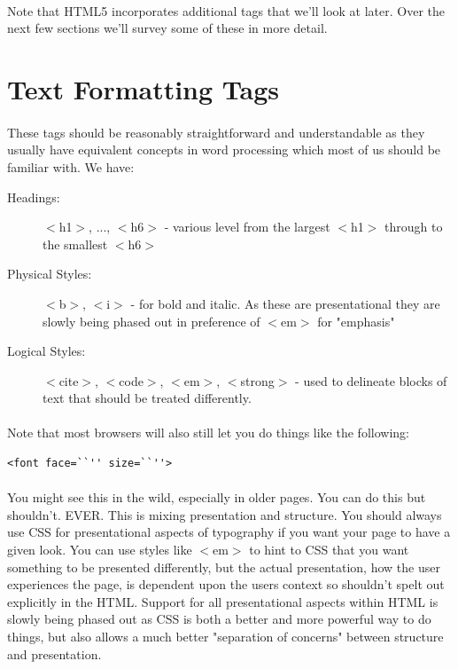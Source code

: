 \paragraph{} Note that HTML5 incorporates additional tags that we'll look at later. Over the next few sections we'll survey some of these in more detail.

\section{Text Formatting Tags}
\paragraph{} These tags should be reasonably straightforward and understandable as they usually have equivalent concepts in word processing which most of us should be familiar with. We have:

\begin{description}
\item [Headings:] $<$h1$>$, ..., $<$h6$>$ - various level from the largest $<$h1$>$ through to the smallest $<$h6$>$ 
\item [Physical Styles:] $<$b$>$, $<$i$>$ - for bold and italic. As these are presentational they are slowly being phased out in preference of $<$em$>$ for "emphasis" 
\item [Logical Styles:] $<$cite$>$, $<$code$>$, $<$em$>$, $<$strong$>$ - used to delineate blocks of text that should be treated differently. 
\end{description}

\paragraph{} Note that most browsers will also still let you do things like the following:

\begin{lstlisting}
<font face=``'' size=``''> 
\end{lstlisting}
\paragraph{} You might see this in the wild, especially in older pages. You can do this but shouldn't. EVER. This is mixing presentation and structure. You should always use CSS for presentational aspects of typography if you want your page to have a given look. You can use styles like $<$em$>$ to hint to CSS that you want something to be presented differently, but the actual presentation, how the user experiences the page, is dependent upon the users context so shouldn't spelt out explicitly in the HTML. Support for all presentational aspects within HTML is slowly being phased out as CSS is both a better and more powerful way to do things, but also allows a much better "separation of concerns" between structure and presentation.

